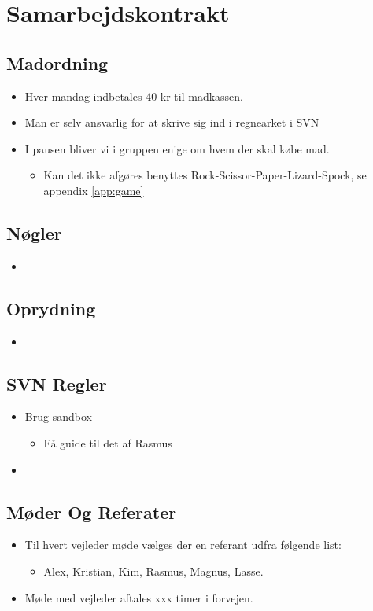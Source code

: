 \documentclass{article}
\begin{document}
\section{Samarbejdskontrakt}
\subsection{Madordning}
\begin{itemize}
	\item Hver mandag indbetales 40 kr til madkassen.
	\item Man er selv ansvarlig for at skrive sig ind i regnearket i SVN
	\item I pausen bliver vi i gruppen enige om hvem der skal købe mad.
	
\begin{itemize}
	\item Kan det ikke afgøres benyttes Rock-Scissor-Paper-Lizard-Spock, se appendix \ref{app:game}
\end{itemize}
\end{itemize}

\subsection{Nøgler}
\begin{itemize}
	\item 
\end{itemize}

\subsection{Oprydning}
\begin{itemize}
	\item 
\end{itemize}

\subsection{SVN Regler}
\begin{itemize}
	\item Brug sandbox
	\begin{itemize}
		\item Få guide til det af Rasmus
	\end{itemize}
	\item 
\end{itemize}

\subsection{Møder Og Referater}
\begin{itemize}
	\item Til hvert vejleder møde vælges der en referant udfra følgende list:
	\begin{itemize}
		\item Alex, Kristian, Kim, Rasmus, Magnus, Lasse.
	\end{itemize}
	\item Møde med vejleder aftales xxx timer i forvejen.
\end{itemize}
\end{document}

